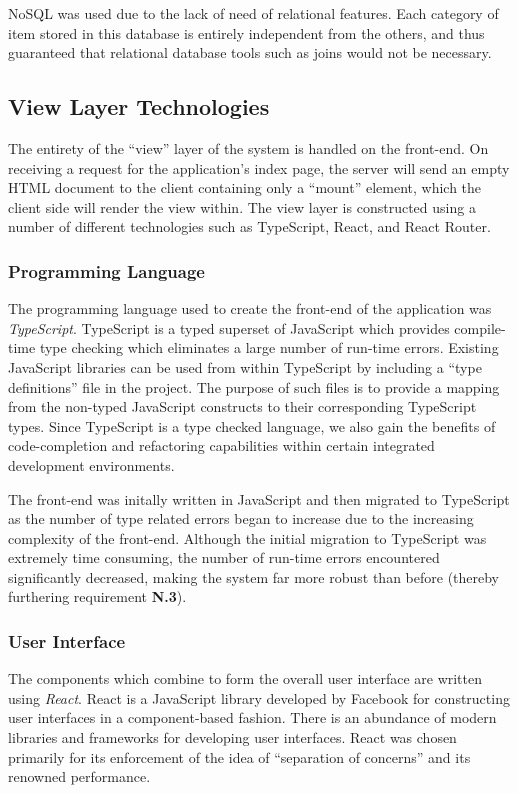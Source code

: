 \documentclass{l4proj}
\begin{document}
         NoSQL was used due to the lack of need of relational features. Each category of item stored in this database is entirely independent from the others, and thus guaranteed that relational database tools such as joins would not be necessary.

    \subsection{View Layer Technologies}
    
    The entirety of the ``view'' layer of the system is handled on the front-end. On receiving a request for the application's index page, the server will send an empty HTML document to the client containing only a ``mount'' element, which the client side will render the view within. The view layer is constructed using a number of different technologies such as TypeScript, React, and React Router.
    
    \subsubsection{Programming Language}
        The programming language used to create the front-end of the application was \textit{TypeScript}. TypeScript is a typed superset of JavaScript which provides compile-time type checking which eliminates a large number of run-time errors. Existing JavaScript libraries can be used from within TypeScript by including a ``type definitions'' file in the project. The purpose of such files is to provide a mapping from the non-typed JavaScript constructs to their corresponding TypeScript types. Since TypeScript is a type checked language, we also gain the benefits of code-completion and refactoring capabilities within certain integrated development environments.
        
        The front-end was initally written in JavaScript and then migrated to TypeScript as the number of type related errors began to increase due to the increasing complexity of the front-end. Although the initial migration to TypeScript was extremely time consuming, the number of run-time errors encountered significantly decreased, making the system far more robust than before (thereby furthering requirement \textbf{N.3}).
    
        \subsubsection{User Interface}
        The components which combine to form the overall user interface are written using \textit{React}. React is a JavaScript library developed by Facebook for constructing user interfaces in a component-based fashion. There is an abundance of modern libraries and frameworks for developing user interfaces. React was chosen primarily for its enforcement of the idea of ``separation of concerns'' and its renowned performance.
        
\end{document}
